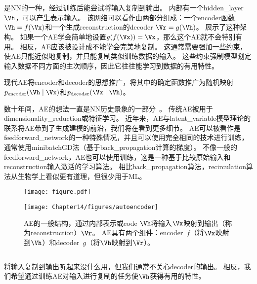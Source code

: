 \chapter{}
\label{chap:autoencoders}
是\gls{NN}的一种，经过训练后能尝试将输入复制到输出。
内部有一个\gls{hidden_layer} $\Vh$，可以产生表示输入。
该网络可以看作由两部分组成：一个\gls{encoder}函数$ \Vh = f(\Vx)$和一个生成\gls{reconstruction}的\gls{decoder} $\Vr=g(\Vh)$。
展示了这种架构。
如果一个\gls{AE}学会简单地设置$g(f(\Vx)) =\Vx$，那么这个\gls{AE}就不会特别有用。
相反，\gls{AE}应该被设计成不能学会完美地复制。
这通常需要强加一些约束，使\gls{AE}只能近似地复制，并只能复制类似训练数据的输入。
这些约束强制模型划定输入数据不同方面的主次顺序，因此它往往能学习到数据的有用特性。


现代\gls{AE}将\gls{encoder}和\gls{decoder}的思想推广，将其中的确定函数推广为随机映射$p_{\text{encoder}} (\Vh \mid \Vx)$和$p_{\text{decoder}}(\Vx \mid \Vh)$。


数十年间，\gls{AE}的想法一直是\gls{NN}历史景象的一部分~\citep{Lecun-these87,Bourlard88,hinton1994amd-small}。
传统\gls{AE}被用于\gls{dimensionality_reduction}或特征学习。
近年来，\gls{AE}与\gls{latent_variable}模型理论的联系将\gls{AE}带到了生成建模的前沿，我们将在看到更多细节。
\gls{AE}可以被看作是\gls{feedforward_network}的一种特殊情况，并且可以使用完全相同的技术进行训练，通常使用\gls{minibatch}\gls{GD}法（基于\gls{back_propagation}计算的梯度）。
不像一般的\gls{feedforward_network}，\gls{AE}也可以使用训练\citep{Hinton+McClelland-NIPS1987}，这是一种基于比较原始输入和\gls{reconstruction}输入激活的学习算法。
相比\gls{back_propagation}算法，\gls{recirculation}算法从生物学上看似更有道理，但很少用于\gls{ML}。

\begin{figure}[!htb]
\ifOpenSource
\centerline{\texttt{[image: figure.pdf]}}
\else
\centerline{\texttt{[image: Chapter14/figures/autoencoder]}}
\fi
\caption{\gls{AE}的一般结构，通过内部表示或\gls{code} $\Vh$将输入$\Vx$映射到输出（称为\gls{reconstruction}）$\Vr$。
\gls{AE}具有两个组件：\gls{encoder}~$f$（将$\Vx$映射到$\Vh$）和\gls{decoder}~$g$（将$\Vh$映射到$\Vr$）。
}
\label{fig:chap14_autoencoder}
\end{figure}


\section{}
\label{sec:undercomplete_autoencoders}
将输入复制到输出听起来没什么用，但我们通常不关心\gls{decoder}的输出。
相反，我们希望通过训练\gls{AE}对输入进行复制的任务使$\Vh$获得有用的特性。


